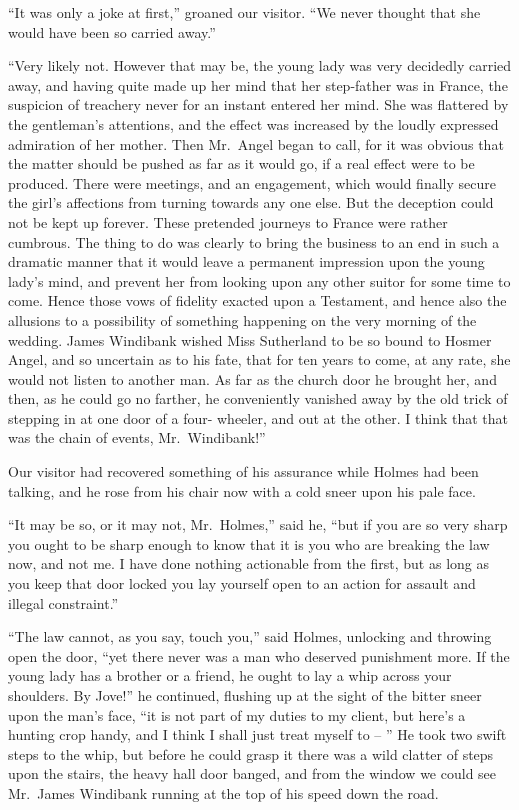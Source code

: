 “It was only a joke at first,” groaned our visitor. “We
never thought that she would have been so carried away.”

“Very likely not. However that may be, the young lady
was very decidedly carried away, and having quite made up
her mind that her step-father was in France, the suspicion of
treachery never for an instant entered her mind. She was
flattered by the gentleman’s attentions, and the effect was
increased by the loudly expressed admiration of her mother.
Then Mr.~Angel began to call, for it was obvious that the
matter should be pushed as far as it would go, if a real effect
were to be produced. There were meetings, and an engagement,
which would finally secure the girl’s affections from
turning towards any one else. But the deception could not
be kept up forever. These pretended journeys to France
were rather cumbrous. The thing to do was clearly to bring
the business to an end in such a dramatic manner that it
would leave a permanent impression upon the young lady’s
mind, and prevent her from looking upon any other suitor for
some time to come. Hence those vows of fidelity exacted
upon a Testament, and hence also the allusions to a possibility
of something happening on the very morning of the
wedding. James Windibank wished Miss Sutherland to be
so bound to Hosmer Angel, and so uncertain as to his fate,
that for ten years to come, at any rate, she would not listen
to another man. As far as the church door he brought her,
and then, as he could go no farther, he conveniently vanished
away by the old trick of stepping in at one door of a four-%
wheeler, and out at the other. I think that that was the chain
of events, Mr.~Windibank!”

Our visitor had recovered something of his assurance while
Holmes had been talking, and he rose from his chair now
with a cold sneer upon his pale face.

“It may be so, or it may not, Mr.~Holmes,” said he, “but if
you are so very sharp you ought to be sharp enough to know
that it is you who are breaking the law now, and not me. I
have done nothing actionable from the first, but as long as
you keep that door locked you lay yourself open to an action
for assault and illegal constraint.”

“The law cannot, as you say, touch you,” said Holmes, unlocking
and throwing open the door, “yet there never was a
man who deserved punishment more. If the young lady has
a brother or a friend, he ought to lay a whip across your
shoulders. By Jove!” he continued, flushing up at the sight
of the bitter sneer upon the man’s face, “it is not part of my
duties to my client, but here’s a hunting crop handy, and I
think I shall just treat myself to -- ” He took two swift steps
to the whip, but before he could grasp it there was a wild
clatter of steps upon the stairs, the heavy hall door banged,
and from the window we could see Mr.~James Windibank
running at the top of his speed down the road.

